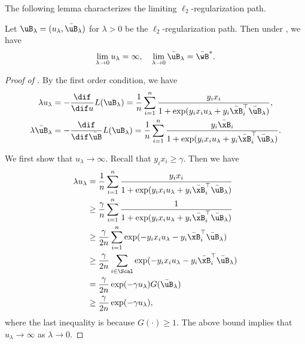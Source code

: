 \documentclass[11pt]{article}
\begin{document}
The following lemma characterizes the limiting $\ell_2$-regularization path.
\begin{lemma}\label{lemma:path:l2-regu}
Let $\uB_{\lambda} = (u_{\lambda}, \bar \uB_{\lambda})$ for $\lambda>0$ be the $\ell_2$-regularization path.
Then under , we have
\begin{align*}
    \lim_{\lambda\to0} u_{\lambda} = \infty,\quad 
    \lim_{\lambda\to0}\bar \uB_{\lambda} = \bar \wB^*.
\end{align*}
\end{lemma}
\begin{proof}[Proof of ]
By the first order condition, we have 
\begin{align*}
\lambda    u_{\lambda} &= -\frac{\dif}{\dif u} L(\uB_{\lambda}) = \frac{1}{n}\sum_{i=1}^n \frac{y_ix_i}{1+\exp(y_i x_i u_{\lambda} + y_i \bar\xB_i^\top \bar\uB_{\lambda} )}, \\
\lambda    \bar\uB_{\lambda} &= -\frac{\dif}{\dif \bar\uB} L(\uB_{\lambda}) = \frac{1}{n}\sum_{i=1}^n \frac{y_i\bar \xB_i}{1+\exp(y_i x_i u_{\lambda} + y_i \bar\xB_i^\top \bar\uB_{\lambda} )}.
\end{align*}

We first show that $u_{\lambda}\to\infty$. Recall that $y_i x_i \ge \gamma$. Then we have 
\begin{align*}
    \lambda    u_{\lambda} &=  \frac{1}{n}\sum_{i=1}^n \frac{y_ix_i}{1+\exp(y_i x_i u_{\lambda} + y_i \bar\xB_i^\top \bar\uB_{\lambda} )} \\
    &\ge  \frac{\gamma}{n}\sum_{i=1}^n \frac{1}{1+\exp(y_i x_i u_{\lambda} + y_i \bar\xB_i^\top \bar\uB_{\lambda} )} \\
    &\ge  \frac{\gamma}{2n}\sum_{i=1}^n \exp(-y_i x_i u_{\lambda} - y_i \bar\xB_i^\top \bar\uB_{\lambda} ) \\
    &\ge \frac{\gamma}{2n}\sum_{i\in\Scal} \exp(-y_i x_i u_{\lambda} - y_i \bar\xB_i^\top \bar\uB_{\lambda} ) \\
    &=  \frac{\gamma}{2n} \exp(-\gamma u_{\lambda}) G ( \bar\uB_{\lambda} ) \\
    &\ge \frac{\gamma}{2n} \exp(-\gamma u_{\lambda}),
\end{align*}
where the last inequality is because $G(\cdot)\ge 1$. The above bound implies that $u_{\lambda}\to\infty$ as $\lambda\to 0$.


\end{proof}
\end{document}
